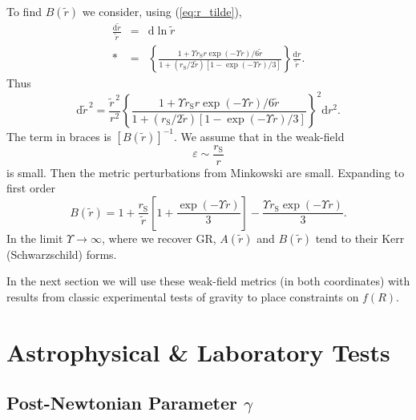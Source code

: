 \documentclass[aps,prd,amsfonts,amssymb,amsmath,nofootinbib,reprint,showpacs]{revtex4-1}
\newcommand{\eqnref}[1]{(\ref{eq:#1})}
\newcommand{\sub}[1]{\ensuremath{_\text{#1}}}
\newcommand{\dd}{\ensuremath{\text{d}}}
\begin{document}
To find $B(\widetilde{r})$ we consider, using \eqnref{r_tilde},
\begin{eqnarray}
\frac{\dd \widetilde{r}}{\widetilde{r}} & = & \dd \ln \widetilde{r} \nonumber \\*
 & = & \left\{\frac{1 + {\Upsilon r\sub{S}r\exp(-\Upsilon r)}/{6\widetilde{r}}}{1 + ({r\sub{S}}/{2\widetilde{r}})\left[1 - {\exp(-\Upsilon r)}/{3}\right]}\right\}\frac{\dd r}{\widetilde{r}}.
\end{eqnarray}
Thus
\begin{equation}
\dd \widetilde{r}^{\,2} = \frac{\widetilde{r}^{\,2}}{r^2}\left\{\frac{1 + {\Upsilon r\sub{S}r\exp(-\Upsilon r)}/{6\widetilde{r}}}{1 + ({r\sub{S}}/{2\widetilde{r}})\left[1 - {\exp(-\Upsilon r)}/{3}\right]}\right\}^2 \dd r^2.
\end{equation}
The term in braces is $\left[B(\widetilde{r})\right]^{-1}$. We assume that in the weak-field
\begin{equation}
\varepsilon \sim \frac{r\sub{S}}{r}
\end{equation}
is small. Then the metric perturbations from Minkowski are small. Expanding to first order~\cite{Olmo2007c}
\begin{equation}
B(\widetilde{r})  = 1 + \frac{r\sub{S}}{\widetilde{r}}\left[1 + \frac{\exp(-\Upsilon r )}{3}\right] - \frac{\Upsilon r\sub{S} \exp(-\Upsilon r)}{3}.
\label{eq:B_metric}
\end{equation}
In the limit $\Upsilon \rightarrow \infty$, where we recover GR, $A(\widetilde{r})$ and $B(\widetilde{r})$ tend to their Kerr (Schwarzschild) forms.

In the next section we will use these weak-field metrics (in both coordinates) with results from classic experimental tests of gravity to place constraints on $f(R)$.

\section{Astrophysical \& Laboratory Tests\label{sec:Tests}}

\subsection{Post-Newtonian Parameter $\gamma$}
\end{document}

